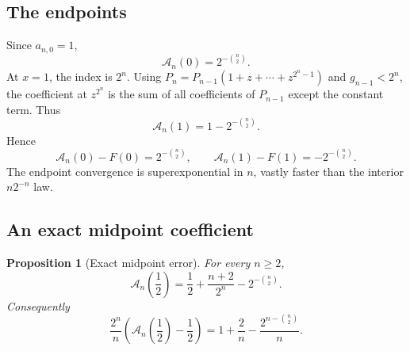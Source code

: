 \documentclass[11pt,oneside]{article}
\newtheorem{proposition}[theorem]{Proposition}
\theoremstyle{definition}
\theoremstyle{remark}
\begin{document}
\subsection{The endpoints}

Since $a_{n,0}=1$,
\begin{equation}
 \mathcal A_n(0)=2^{-\binom n2}.                            \label{tmrate:eq:A-zero}
\end{equation}
At $x=1$, the index is $2^n$.  Using
$P_n=P_{n-1}(1+z+\cdots+z^{2^n-1})$ and
$g_{n-1}<2^n$, the coefficient at $z^{2^n}$ is the sum of all coefficients of
$P_{n-1}$ except the constant term.  Thus
\begin{equation}
 \mathcal A_n(1)=1-2^{-\binom n2}.                          \label{tmrate:eq:A-one}
\end{equation}
Hence
\begin{equation}
 \mathcal A_n(0)-F(0)=2^{-\binom n2},
 \qquad
 \mathcal A_n(1)-F(1)=-2^{-\binom n2}.                     \label{tmrate:eq:endpoint-errors}
\end{equation}
The endpoint convergence is superexponential in $n$, vastly faster than the
interior $n2^{-n}$ law.

\subsection{An exact midpoint coefficient}

\begin{proposition}[Exact midpoint error]
\label{tmrate:prop:midpoint-exact}
For every $n\ge2$,
\begin{equation}
 \boxed{\displaystyle
 \mathcal A_n\!\left(\frac12\right)
 =\frac12+\frac{n+2}{2^n}-2^{-\binom n2}.}                 \label{tmrate:eq:midpoint-exact}
\end{equation}
Consequently
\begin{equation}
 \frac{2^n}{n}
 \left(\mathcal A_n\!\left(\frac12\right)-\frac12\right)
 =1+\frac2n-\frac{2^{n-\binom n2}}{n}.                    \label{tmrate:eq:midpoint-scaled}
\end{equation}
\end{proposition}
\end{document}
